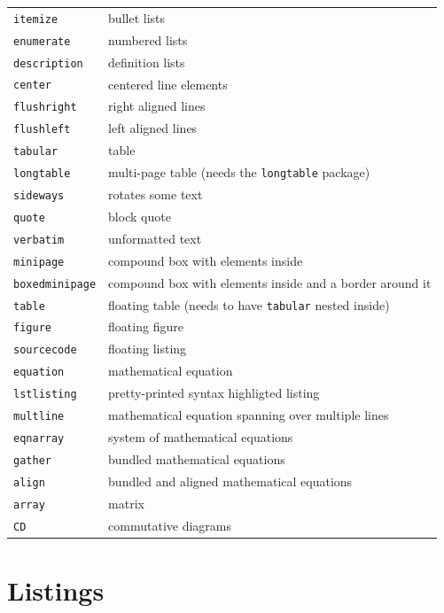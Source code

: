 \documentclass{uvamscse}
\begin{document}
\begin{center}
\begin{tabular}{ll}
  \texttt{itemize}      & bullet lists\\
  \texttt{enumerate}    & numbered lists\\
  \texttt{description}  & definition lists\\
  \hline
  \texttt{center}       & centered line elements\\
  \texttt{flushright}   & right aligned lines\\
  \texttt{flushleft}    & left aligned lines\\
  \hline
  \texttt{tabular}      & table\\
  \texttt{longtable}    & multi-page table (needs the \texttt{longtable} package)\\
  \texttt{sideways}     & rotates some text\\
  \texttt{quote}        & block quote\\
  \texttt{verbatim}     & unformatted text\\
  \texttt{minipage}     & compound box with elements inside\\
  \texttt{boxedminipage}& compound box with elements inside and a border around it\\
  \hline
  \texttt{table}        & floating table (needs to have \texttt{tabular} nested inside)\\
  \texttt{figure}       & floating figure\\
  \texttt{sourcecode}   & floating listing\\
  \hline
  \texttt{equation}     & mathematical equation\\
  \texttt{lstlisting}   & pretty-printed syntax highligted listing\\
  \texttt{multline}     & mathematical equation spanning over multiple lines\\
  \texttt{eqnarray}     & system of mathematical equations\\
  \texttt{gather}       & bundled mathematical equations\\
  \texttt{align}        & bundled and aligned mathematical equations\\
  \texttt{array}        & matrix\\
  \texttt{CD}           & commutative diagrams\\
\end{tabular}
\end{center}

\section{Listings}
\end{document}
